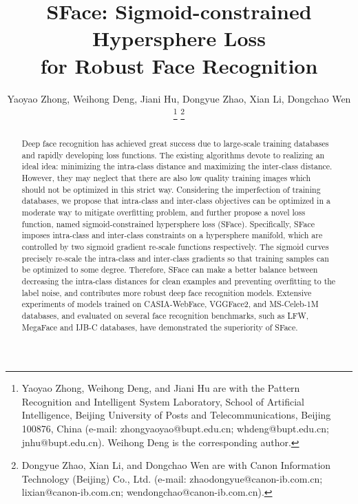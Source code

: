 \documentclass[journal,comsoc]{IEEEtran}
\begin{document}
	
	
	\title{SFace: Sigmoid-constrained Hypersphere Loss \\ for Robust Face Recognition}
	\author{Yaoyao Zhong,
		Weihong Deng, 
		Jiani Hu,
		Dongyue Zhao,
		Xian Li,
		Dongchao Wen
		\thanks{Yaoyao Zhong, Weihong Deng, and Jiani Hu are with the Pattern Recognition and Intelligent System
			Laboratory, School of Artificial Intelligence, Beijing University of Posts and Telecommunications, Beijing 100876, China (e-mail: zhongyaoyao@bupt.edu.cn; whdeng@bupt.edu.cn; jnhu@bupt.edu.cn). Weihong Deng is the corresponding author. }
		\thanks{Dongyue Zhao, Xian Li, and Dongchao Wen are with Canon Information Technology (Beijing) Co., Ltd. (e-mail: zhaodongyue@canon-ib.com.cn; lixian@canon-ib.com.cn; wendongchao@canon-ib.com.cn).}
	}
	\maketitle
	
\begin{abstract}
Deep face recognition has achieved great success due to large-scale training databases and rapidly developing loss functions. The existing algorithms devote to realizing an ideal idea: minimizing the intra-class distance and maximizing the inter-class distance. However, they may neglect that there are also low quality training images which should not be optimized in this strict way. Considering the imperfection of training databases, we propose that intra-class and inter-class objectives can be optimized in a moderate way to mitigate overfitting problem, and further propose a novel loss function, named sigmoid-constrained hypersphere loss (SFace). Specifically, SFace imposes intra-class and inter-class constraints on a hypersphere manifold, which are controlled by two sigmoid gradient re-scale functions respectively. The sigmoid curves precisely re-scale the intra-class and inter-class gradients so that training samples can be optimized to some degree. Therefore, SFace can make a better balance between decreasing the intra-class distances for clean examples and preventing overfitting to the label noise, and contributes more robust deep face recognition models. Extensive experiments of models trained on CASIA-WebFace, VGGFace2, and MS-Celeb-1M databases, and evaluated on several face recognition benchmarks, such as LFW, MegaFace and IJB-C databases, have demonstrated the superiority of SFace.    
\end{abstract}
\IEEEpeerreviewmaketitle
\end{document}
